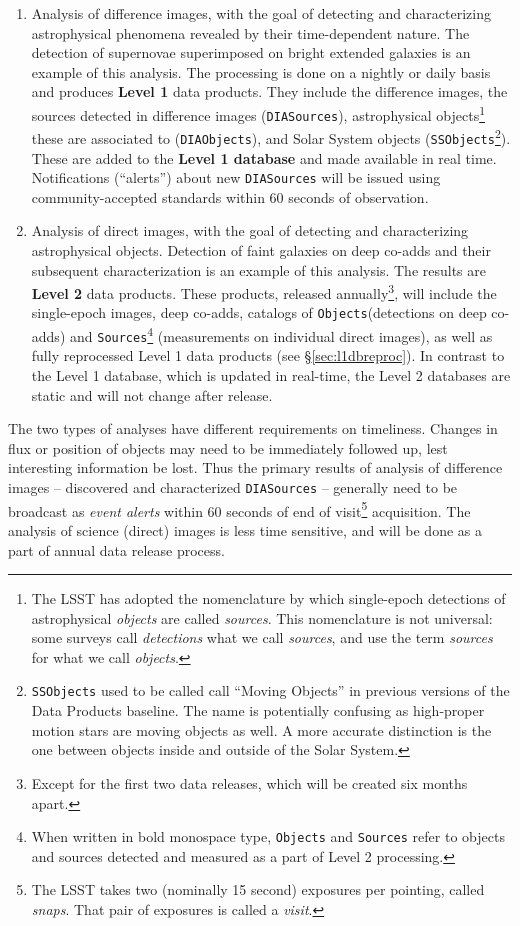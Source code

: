 \documentclass[12pt]{article}
\newcommand{\code}[1]{\texttt{#1}}
\newcommand{\DIASources}{\code{DIASources}\xspace}
\newcommand{\DIAObjects}{\code{DIAObjects}\xspace}
\newcommand{\DB}{{Level 1 database}\xspace}
\newcommand{\DR}{{Level 2 database}\xspace}
\newcommand{\Objects}{\code{Objects}\xspace}
\newcommand{\Sources}{\code{Sources}\xspace}
\newcommand{\SSObjects}{\code{SSObjects}\xspace}
\begin{document}
\begin{enumerate}
\item Analysis of difference images, with the goal of detecting and characterizing astrophysical phenomena revealed by their time-dependent nature. The detection of supernovae superimposed on bright extended galaxies is an example of this analysis. The processing is done on a nightly or daily basis and produces {\bf Level 1} data products. They include the difference images, the sources detected in difference images (\DIASources), astrophysical objects\footnote{The LSST has adopted the nomenclature by which single-epoch detections of astrophysical {\em objects} are called {\em sources}. This nomenclature is not universal: some surveys call {\em detections} what we call {\em sources}, and use the term {\em sources} for what we call {\em objects}.} these are associated to (\DIAObjects), and Solar System objects (\SSObjects\footnote{\SSObjects used to be called call ``Moving Objects'' in previous versions of the Data Products baseline. The name is potentially confusing as high-proper motion stars are moving objects as well. A more accurate distinction is the one between objects inside and outside of the Solar System.}). These are added to the {\bf \DB} and made available in real time. Notifications (``alerts'') about new \DIASources will be issued using community-accepted standards within 60 seconds of observation.
\item Analysis of direct images, with the goal of detecting and characterizing astrophysical objects. Detection of faint galaxies on deep co-adds and their subsequent characterization is an example of this analysis. The results are {\bf Level 2} data products. These products, released annually\footnote{Except for the first two data releases, which will be created six months apart.}, will include the single-epoch images, deep co-adds, catalogs of \Objects (detections on deep co-adds) and \Sources\footnote{When written in bold monospace type, \Objects and \Sources refer to objects and sources detected and measured as a part of Level 2 processing.} (measurements on individual direct images), as well as fully reprocessed Level 1 data products (see \S \ref{sec:l1dbreproc}). In contrast to the \DB, which is updated in real-time, the \DR{}s are static and will not change after release.
\end{enumerate}
 
The two types of analyses have different requirements on timeliness. Changes in flux or position of objects may need to be immediately followed up, lest interesting information be lost. Thus the primary results of analysis of difference images -- discovered and characterized \DIASources{} -- generally need to be broadcast as {\em event alerts} within 60 seconds of end of visit\footnote{The LSST takes two (nominally 15 second) exposures per pointing, called {\em snaps}. That pair of exposures is called a {\em visit}.} acquisition. The analysis of science (direct) images is less time sensitive, and will be done as a part of annual data release process.
\end{document}
